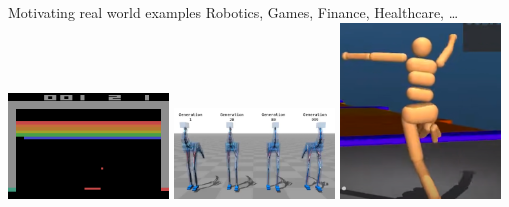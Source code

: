 \documentclass[presentation, 9pt]{beamer}\mode<presentation>{\usetheme{AMSBolognaFC}}
\begin{document}
\begin{frame}{Motivating real world examples}
\Large \centering
Robotics, Games, Finance, Healthcare, \dots \\[2cm]
\centering
\href{https://www.youtube.com/watch?v=V1eYniJ0Rnk}{\includegraphics[width=0.32\textwidth]{img/atari.png}}
\href{https://www.youtube.com/watch?v=43cO39XBPIA}{\includegraphics[width=0.32\textwidth]{img/robots.png}}
\href{https://www.youtube.com/watch?v=gn4nRCC9TwQ}{\includegraphics[width=0.32\textwidth]{img/ppo.png}}
\end{frame}
\end{document}
